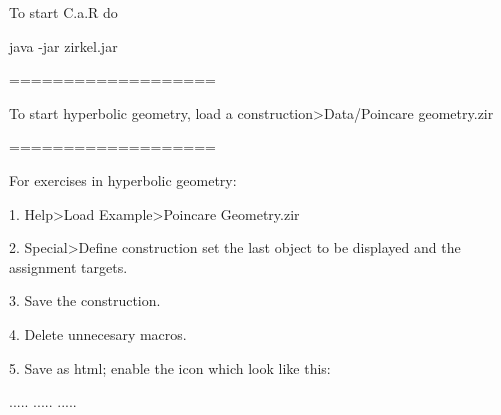 To start C.a.R do

java -jar zirkel.jar

===================

To start hyperbolic geometry, load a construction>Data/Poincare geometry.zir

===================

For exercises in hyperbolic geometry:

1. Help>Load Example>Poincare Geometry.zir

2. Special>Define construction set the last object to be displayed and the assignment targets.

3. Save the construction.

4. Delete unnecesary macros.

5. Save as html; enable the icon which look like this:

.....
.....
.....
